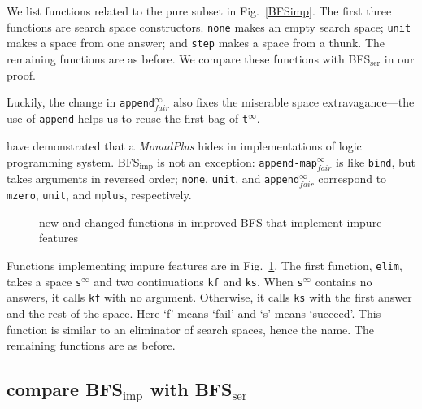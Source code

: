\documentclass[format=acmlarge, review=true, authordraft=true]{acmart}
\newcommand{\BFSser}[0]{BFS$_\textrm{ser}$}
\newcommand{\BFSimp}[0]{BFS$_\textrm{imp}$}
\begin{document}
We list functions related to the pure subset in Fig.~\ref{BFSimp}. The first 
three functions are search space constructors. \texttt{none} makes an empty 
search space; \texttt{unit} makes a space from one answer; and \texttt{step} 
makes a space from a thunk. The remaining functions are as before. We compare 
these functions with \BFSser{} in our proof. 

Luckily, the change in \texttt{append$^\infty_{fair}$} also fixes the miserable 
space extravagance---the use of \texttt{append} helps us to reuse the first bag 
of \texttt{t$^\infty$}.


\citet{kiselyov2005backtracking} have demonstrated that a \emph{MonadPlus} 
hides in implementations of logic programming system. \BFSimp{} is not an 
exception: \texttt{append-map$^\infty_{fair}$} is like \texttt{bind}, but takes 
arguments in reversed order; \texttt{none}, \texttt{unit}, and 
\texttt{append$^\infty_{fair}$} correspond to \texttt{mzero}, \texttt{unit}, and 
\texttt{mplus}, respectively.

\begin{figure}
		
	\caption{new and changed functions in improved BFS that implement impure 
		features}
	\label{BFSimp-cont}
\end{figure}

Functions implementing impure features are in Fig.~\ref{BFSimp-cont}. The 
first function, \texttt{elim}, takes a space \texttt{s$^\infty$} and two 
continuations \texttt{kf} and \texttt{ks}. When \texttt{s$^\infty$} contains 
no answers, it calls \texttt{kf} with no argument. Otherwise, it calls 
\texttt{ks} with the first answer and the rest of the space. Here  `f' means 
`fail' and `s' means `succeed'. This function is similar to an eliminator of 
search spaces, hence the name. The remaining functions are as before.


\subsection{compare \BFSimp{} with \BFSser{}}

\end{document}
